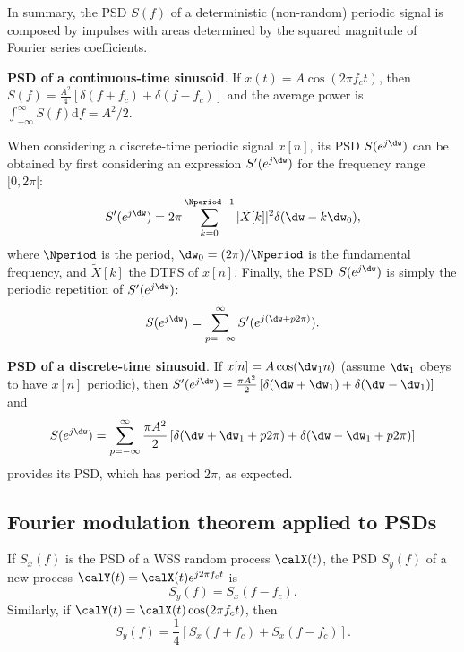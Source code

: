 In summary, the PSD $S(f)$ of a deterministic (non-random) periodic signal is composed by impulses with areas determined by the squared magnitude of Fourier series coefficients.

\bExample \textbf{PSD of a continuous-time sinusoid}.
If $x(t)=A\cos(2 \pi f_c t)$, then 
$S(f) = \frac{A^2}{4}\left[\delta(f+f_c) + \delta(f-f_c) \right]$ and the average power is
$\int_{-\infty}^{\infty} S(f) \textrm{d}f = A^2/2$.
\eExample

When considering a discrete-time periodic signal $x[n]$, its PSD $S(e^{j\dw})$ can be obtained by first considering an expression $S'(e^{j\dw})$ for the frequency range $[0,2\pi[$:
\begin{equation}
S'(e^{j\dw}) = 2 \pi \sum_{k=0}^{\Nperiod-1} |\tilde X[k]|^2 \delta(\dw - k \dw_0),
\end{equation}
where $\Nperiod$ is the period, $\dw_0 = (2 \pi) / \Nperiod$ is the fundamental frequency, and $\tilde X[k]$ the DTFS of $x[n]$. Finally, the PSD 
$S(e^{j\dw})$ is simply the periodic repetition of $S'(e^{j\dw})$:
\begin{equation}
S(e^{j\dw}) = \sum_{p=-\infty}^{\infty} S'(e^{j(\dw+p2\pi)}).
\end{equation}

\bExample \textbf{PSD of a discrete-time sinusoid}.
If $x[n]=A\cos(\dw_1n)$ (assume $\dw_1$ obeys  to have $x[n]$ periodic), then %
$S'(e^{j\dw}) = \frac{\pi A^2}{2}\left[\delta(\dw+\dw_1) + \delta(\dw-\dw_1) \right]$ and
\[
S(e^{j\dw}) = \sum_{p=-\infty}^{\infty} \frac{\pi A^2}{2}\left[\delta(\dw+\dw_1+p2\pi) + \delta(\dw-\dw_1+p2\pi) \right]
\]
provides its PSD, which has period $2 \pi$, as expected.
\eExample

\subsection{{\akadvanced} Fourier modulation theorem applied to PSDs}
\label{sec:modulationTheoremPSD}

If $S_x(f)$ is the PSD of a WSS random process $\calX(t)$, the PSD $S_y(f)$ of a new process $\calY(t) = \calX(t) e^{j 2 \pi f_c t}$ is
\begin{equation}
S_y(f) = S_x(f-f_c).
\label{eq:psdComplexExpModulationTheorem}
\end{equation}
Similarly, if 
$\calY(t) = \calX(t) \cos(2 \pi f_c t)$, then
\begin{equation}
S_y(f) = \frac{1}{4} \left[S_x(f+f_c) + S_x(f-f_c) \right].
\label{eq:psdCosineModulationTheorem}
\end{equation}

